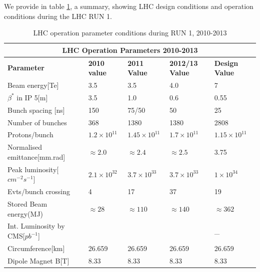 We provide in table \ref{tab:tableLHC}, a summary, showing LHC design conditions and operation conditions during the LHC RUN 1. 
\begin{center}
 \begin{table}[H]
  \begin{turn}{90}
  \centering
  \begin{tabular}{|l|l|l|l|l|}
  \hline \hline
  \multicolumn{5}{|c|}{\bfseries{LHC Operation Parameters 2010-2013}} \\
  \hline \hline
  \bfseries{Parameter} & \bfseries{2010 value} & \bfseries{2011 Value} & \bfseries{2012/13 Value} & \bfseries{Design Value} \\
   \hline \hline
   Beam energy[Te] & 3.5  & 3.5  & 4.0  & 7 \\ 
  \hline
  $\beta^{\ast}$ in IP 5[m] & 3.5 & 1.0 & 0.6  & 0.55 \\
  \hline
   Bunch spacing [ns]& 150 & 75/50 & 50 & 25 \\
  \hline
  Number of bunches & 368 & 1380 & 1380 & 2808 \\
  \hline
  Protons/bunch  & $1.2 \times 10^{11}$ & $1.45 \times 10^{11}$ &  $1.7 \times 10^{11}$& $1.15 \times 10^{11}$ \\
  \hline
  Normalised emittance[mm.rad] & $\approx 2.0$ & $\approx 2.4$ & $\approx 2.5$ &  3.75\\
  \hline
  Peak luminosity[$cm^{-2}s^{-1}$]& $2.1 \times 10^{32}$ & $3.7 \times 10^{33}$ & $3.7 \times 10^{33}$ & $1 \times 10^{34}$ \\
  \hline
  Evts/bunch crossing & 4 & 17 & 37 &  19 \\
  \hline
  Stored Beam energy(MJ)& $\approx 28$ &  $\approx 110$  & $\approx 140$  & $\approx 362$ \\
  \hline
  Int. Luminosity by CMS[$pb^{-1}$]&  &  &  &  \_ \\
 \hline
 Circumference[km]  &26.659 & 26.659 & 26.659 & 26.659 \\
 \hline
 Dipole Magnet B[T] & 8.33 & 8.33 & 8.33 & 8.33 \\
 \hline  
  \end{tabular}
   \caption{LHC operation parameter conditions during RUN 1, 2010-2013}
   \label{tab:tableLHC}
   \end{turn}
  \end{table}
\end{center}


